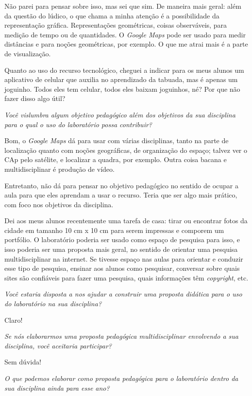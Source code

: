 Não parei para pensar sobre isso, mas sei que sim. De maneira mais geral: além da questão do lúdico, o que chama a minha atenção é a possibilidade da representação gráfica. Representações geométricas, coisas observáveis, para medição de tempo ou de quantidades. O \textit{Google Maps} pode ser usado para medir distâncias e para noções geométricas, por exemplo. O que me atrai mais é a parte de visualização.

Quanto ao uso do recurso tecnológico, cheguei a indicar para os meus alunos um aplicativo de celular que auxilia no aprendizado da tabuada, mas é apenas um joguinho. Todos eles tem celular, todos eles baixam joguinhos, né? Por que não fazer disso algo útil?

\textit{Você vislumbra algum objetivo pedagógico além dos objetivos da sua disciplina para o qual o uso do laboratório possa contribuir?}

Bom, o \textit{Google Maps} dá para usar com várias disciplinas, tanto na parte de localização quanto com noções geográficas, de organização do espaço; talvez ver o CAp pelo satélite, e localizar a quadra, por exemplo. Outra coisa bacana e multidisciplinar é produção de vídeo.

Entretanto, não dá para pensar no objetivo pedagógico no sentido de ocupar a aula para que eles aprendam a usar o recurso. Teria que ser algo mais prático, com foco nos objetivos da disciplina.

Dei aos meus alunos recentemente uma tarefa de casa: tirar ou encontrar fotos da cidade em tamanho 10 cm x 10 cm para serem impressas e comporem um portfólio. O laboratório poderia ser usado como espaço de pesquisa para isso, e isso poderia ser uma proposta mais geral, no sentido de orientar uma pesquisa multidisciplinar na internet. Se tivesse espaço nas aulas para orientar e conduzir esse tipo de pesquisa, ensinar aos alunos como pesquisar, conversar sobre quais sites são confiáveis para fazer uma pesquisa, quais informações têm \textit{copyright}, etc.

\textit{Você estaria disposta a nos ajudar a construir uma proposta didática para o uso do laboratório na sua disciplina?}

Claro!

\textit{Se nós elaborarmos uma proposta pedagógica multidisciplinar envolvendo a sua disciplina, você aceitaria participar?}

Sem dúvida!

\textit{O que podemos elaborar como proposta pedagógica para o laboratório dentro da sua disciplina ainda para esse ano?}

